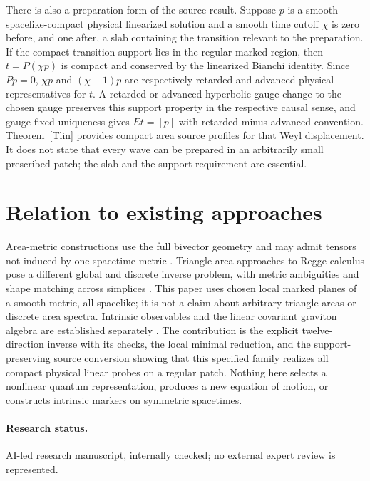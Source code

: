 \documentclass[11pt]{article}
\begin{document}
There is also a preparation form of the source result. Suppose \(p\) is a smooth spacelike-compact physical linearized solution and a smooth time cutoff \(\chi\) is zero before, and one after, a slab containing the transition relevant to the preparation. If the compact transition support lies in the regular marked region, then \(t=P(\chi p)\) is compact and conserved by the linearized Bianchi identity. Since \(Pp=0\), \(\chi p\) and \((\chi-1)p\) are respectively retarded and advanced physical representatives for \(t\). A retarded or advanced hyperbolic gauge change to the chosen gauge preserves this support property in the respective causal sense, and gauge-fixed uniqueness gives \(Et=[p]\) with retarded-minus-advanced convention. Theorem~\ref{Tlin} provides compact area source profiles for that Weyl displacement. It does not state that every wave can be prepared in an arbitrarily small prescribed patch; the slab and the support requirement are essential.

\section{Relation to existing approaches}
Area-metric constructions use the full bivector geometry and may admit tensors not induced by one spacetime metric \cite{SW}. Triangle-area approaches to Regge calculus pose a different global and discrete inverse problem, with metric ambiguities and shape matching across simplices \cite{BRW}. This paper uses chosen local marked planes of a smooth metric, all spacelike; it is not a claim about arbitrary triangle areas or discrete area spectra. Intrinsic observables and the linear covariant graviton algebra are established separately \cite{Khavkine,BFR,FH}. The contribution is the explicit twelve-direction inverse with its checks, the local minimal reduction, and the support-preserving source conversion showing that this specified family realizes all compact physical linear probes on a regular patch. Nothing here selects a nonlinear quantum representation, produces a new equation of motion, or constructs intrinsic markers on symmetric spacetimes.

\paragraph{Research status.} AI-led research manuscript, internally checked; no external expert review is represented.
\end{document}
